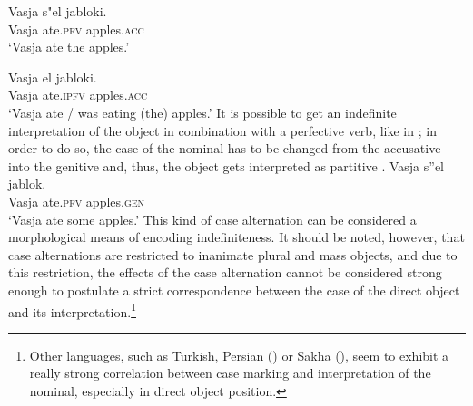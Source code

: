 \documentclass[output=paper,
colorlinks,
citecolor=brown,
newtxmath
]{langscibook}
\begin{document}
\ea \label{ex:4}
\gll Vasja s"el		jabloki.\\
Vasja ate.\textsc{pfv}		apples.\textsc{acc}\\
\glt `Vasja ate the apples.'
\z

\ea \label{ex:5}
\gll	Vasja	el			jabloki.\\
Vasja ate.\textsc{ipfv}  apples.\textsc{acc}\\
\glt `Vasja ate / was eating (the) apples.'
\z
\noindent It is possible to get an indefinite interpretation of the object in combination with a perfective verb, like in ; in order to do so, the case of the nominal has to be changed from the accusative into the genitive and, thus, the object gets interpreted as partitive .   %
\ea \label{ex:6}
\gll Vasja s''el		jablok.\\
Vasja	ate.\textsc{pfv}		apples.\textsc{gen}\\
\glt `Vasja ate some apples.'
\z
\noindent
\noindent
This kind of case alternation can be considered a morphological means of encoding indefiniteness. It should be noted, however,  that case alternations are %
restricted to inanimate plural and mass objects, and due to this restriction, the effects of the case alternation cannot be considered strong enough to postulate a strict correspondence between the case of the direct object and its interpretation.\footnote {Other languages, such as Turkish, Persian (\citealt{Comrie1981}) or Sakha (\citealt{Baker2015}), seem to exhibit a really strong correlation between case marking and interpretation of the nominal, especially in direct object position.}
\end{document}
